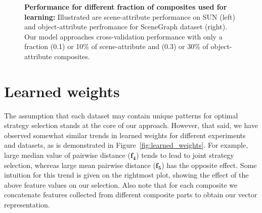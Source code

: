 \documentclass[runningheads]{llncs}
\begin{document}
\begin{figure}
    \centering
    \qquad
    \caption{{\bf Performance for different fraction of composites used for learning:} Illustrated  are scene-attribute performance on SUN  (left) and object-attribute perfromance for SceneGraph dataset (right). Our model approaches cross-validation performance with only a fraction (0.1) or 10\% of scene-attribute and (0.3) or 30\% of object-attribute composites.}%
    \label{fig:learning_portions}%
    \vspace{-0.2in}
\end{figure}


\section{Learned weights}
The assumption that each dataset may contain unique patterns for optimal strategy selection stands at the core of our approach. However, that said, we have observed somewhat similar trends in learned weights for different experiments and datasets, as is demonstrated in Figure~\ref{fig:learned_weights}. For example, large median value of pairwise distance ($\mathbf{f_4}$) tends to lead to joint strategy selection, whereas large mean pairwise distance ($\mathbf{f_5}$) has the opposite effect. Some intuition for this trend is given on the rightmost plot, showing the effect of the above feature values on our selection. Also note that for each composite we concatenate features collected from different composite parts to obtain our vector representation.
\end{document}
